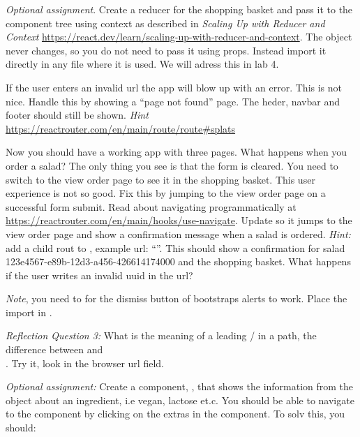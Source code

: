 \documentclass[fleqn, article, a4paper]{memoir}
\begin{document}
\begin{Assignments}
\item \label{opt:redux} \emph{Optional assignment}. Create a reducer for the shopping basket and pass it to the component tree using context as described in \emph{Scaling Up with Reducer and Context} \url{https://react.dev/learn/scaling-up-with-reducer-and-context}. The  object never changes, so you do not need to pass it using props. Instead import it directly in any file where it is used. We will adress this in lab 4.

\item If the user enters an invalid url the app will blow up with an error. This is not nice. Handle this by showing a ``page not found'' page. The heder, navbar and footer should still be shown. \emph{Hint} \url{https://reactrouter.com/en/main/route/route#splats}

\item Now you should have a working app with three pages. What happens when you order a salad? The only thing you see is that the form is cleared. You need to switch to the view order page to see it in the shopping basket. This user experience is not so good. Fix this by jumping to the view order page on a successful form submit. Read about navigating programmatically at \url{https://reactrouter.com/en/main/hooks/use-navigate}. Update  so it jumps to the view order page and show a confirmation message when a salad is ordered. \emph{Hint:} add a child rout to , example url: ``''. This should show a confirmation for salad 123e4567-e89b-12d3-a456-426614174000 and the shopping basket. What happens if the user writes an invalid uuid in the url?

\emph{Note}, you need to  for the dismiss button of bootstraps alerts to work. Place the import in .

\emph{Reflection Question 3:} What is the meaning of a leading / in a path, the difference between  and \\ . Try it, look in the browser url field.

\item \emph{Optional assignment:} Create a component, , that shows the information from the  object about an ingredient, i.e vegan, lactose et.c. You should be able to navigate to the  component by clicking on the extras in the  component. To solv this, you should:


\end{Assignments}
\end{document}
